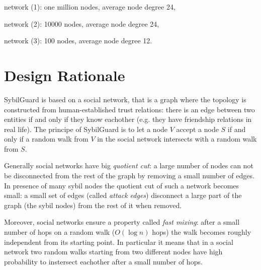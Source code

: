 \documentclass[a4paper,11pt]{article}
\begin{document}

network (1): one million nodes, average node degree 24,

network (2): 10000 nodes, average node degree 24, 

network (3): 100 nodes, average node degree 12.

\section{Design Rationale}


SybilGuard is based on a social network, that is a graph where the topology is constructed from human-established trust relations: there is an edge between two entities if and only if they know eachother (e.g. they have friendship relations in real life).
The principe of SybilGuard is to let a node $V$ accept a node $S$ if and only if a random walk from $V$ in the social network intersects with a random walk from $S$.

Generally social networks have  big \emph{quotient cut}: a large number of nodes can not be disconnected from the rest of the graph by removing a small number of edges.
In presence of many sybil nodes the quotient cut of such a network becomes small: a small set of edges (called \emph{attack edges}) disconnect a large part of the graph (the sybil nodes) from the rest of it when removed.

Moreover, social networks ensure a property called \emph{fast mixing}: after a small number of hops on a random walk ($O(\log n)$ hops) the walk becomes roughly independent from its starting point.
In particular it means that in a social network two random walks starting from two different nodes have high probability to instersect eachother after a small number of hops.

\end{document}
